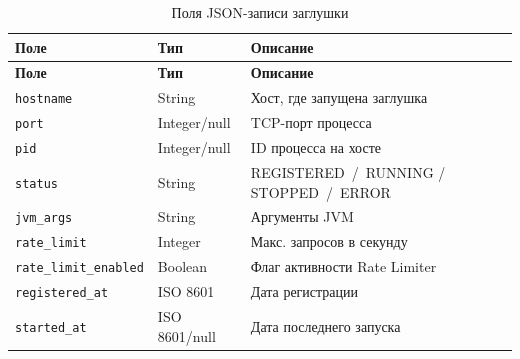
\begin{xltabular}{\textwidth}{|l|l|X|}
\caption{Поля JSON-записи заглушки} \label{tab:mock-fields} \\
\hline
\textbf{Поле} & \textbf{Тип} & \textbf{Описание} \\ \hline
\endfirsthead
\hline
\textbf{Поле} & \textbf{Тип} & \textbf{Описание} \\ \hline
\endhead

\texttt{hostname} & String & Хост, где запущена заглушка \\ \hline
\texttt{port} & Integer/null & TCP-порт процесса \\ \hline
\texttt{pid} & Integer/null & ID процесса на хосте \\ \hline
\texttt{status} & String & REGISTERED~/~RUNNING / STOPPED~/~ERROR \\ \hline
\texttt{jvm\_args} & String & Аргументы JVM \\ \hline
\texttt{rate\_limit} & Integer & Макс. запросов в секунду \\ \hline
\texttt{rate\_limit\_enabled} & Boolean & Флаг активности Rate Limiter \\ \hline
\texttt{registered\_at} & ISO 8601 & Дата регистрации \\ \hline
\texttt{started\_at} & ISO 8601/null & Дата последнего запуска \\ \hline
\end{xltabular}


